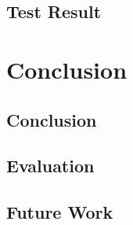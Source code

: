 \documentclass{article}
\begin{document}
		\subsection{Test Result}
		\newpage	
	\section{Conclusion}
		\subsection{Conclusion}
		\subsection{Evaluation}
		\subsection{Future Work}
	\newpage

	
	

\end{document}
